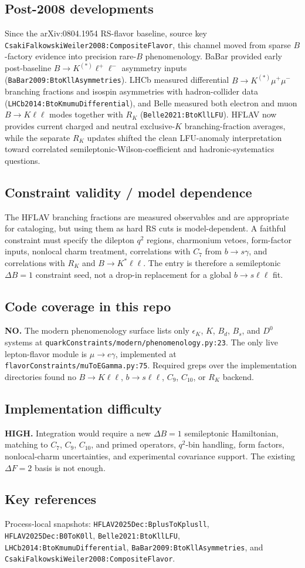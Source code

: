 \subsection*{Post-2008 developments}
Since the arXiv:0804.1954 RS-flavor baseline, source key
\texttt{CsakiFalkowskiWeiler2008:CompositeFlavor}, this channel moved from
sparse \(B\)-factory evidence into precision rare-\(B\) phenomenology.  BaBar
provided early post-baseline \(B\to K^{(*)}\ell^+\ell^-\) asymmetry inputs
(\texttt{BaBar2009:BtoKllAsymmetries}).  LHCb measured differential
\(B\to K^{(*)}\mu^+\mu^-\) branching fractions and isospin asymmetries with
hadron-collider data (\texttt{LHCb2014:BtoKmumuDifferential}), and Belle
measured both electron and muon \(B\to K\ell\ell\) modes together with \(R_K\)
(\texttt{Belle2021:BtoKllLFU}).  HFLAV now provides current charged and
neutral exclusive-\(K\) branching-fraction averages, while the separate \(R_K\)
updates shifted the clean LFU-anomaly interpretation toward correlated
semileptonic-Wilson-coefficient and hadronic-systematics questions.

\subsection*{Constraint validity / model dependence}
The HFLAV branching fractions are measured observables and are appropriate for
cataloging, but using them as hard RS cuts is model-dependent.  A faithful
constraint must specify the dilepton \(q^2\) regions, charmonium vetoes,
form-factor inputs, nonlocal charm treatment, correlations with \(C_7\) from
\(b\to s\gamma\), and correlations with \(R_K\) and \(B\to K^*\ell\ell\).
The entry is therefore a semileptonic \(\Delta B=1\) constraint seed, not a
drop-in replacement for a global \(b\to s\ell\ell\) fit.

\subsection*{Code coverage in this repo}
\textbf{NO.}  The modern phenomenology surface lists only
\(\epsilon_K\), \(K\), \(B_d\), \(B_s\), and \(D^0\) systems at
\texttt{quarkConstraints/modern/phenomenology.py:23}.  The only live
lepton-flavor module is \(\mu\to e\gamma\), implemented at
\texttt{flavorConstraints/muToEGamma.py:75}.  Required greps over the
implementation directories found no \(B\to K\ell\ell\), \(b\to s\ell\ell\),
\(C_9\), \(C_{10}\), or \(R_K\) backend.

\subsection*{Implementation difficulty}
\textbf{HIGH.}  Integration would require a new \(\Delta B=1\) semileptonic
Hamiltonian, matching to \(C_7\), \(C_9\), \(C_{10}\), and primed operators,
\(q^2\)-bin
handling, form factors, nonlocal-charm uncertainties, and experimental
covariance support.  The existing \(\Delta F=2\) basis is not enough.

\subsection*{Key references}
Process-local snapshots: \texttt{HFLAV2025Dec:BplusToKplusll},
\texttt{HFLAV2025Dec:B0ToK0ll}, \texttt{Belle2021:BtoKllLFU},
\texttt{LHCb2014:BtoKmumuDifferential},
\texttt{BaBar2009:BtoKllAsymmetries}, and
\texttt{CsakiFalkowskiWeiler2008:CompositeFlavor}.
